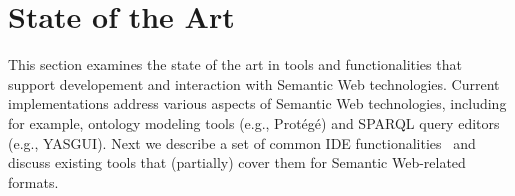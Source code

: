 %
%
%
%
%
%
%
%
%
%
%
%
%
%



\section{State of the Art}%
\label{sec:related_work}

This section examines the state of the art in tools and functionalities that support developement and interaction with Semantic Web technologies. 
Current implementations address various aspects of Semantic Web technologies, including for example, ontology modeling tools (e.g., Protégé) and SPARQL query editors (e.g., YASGUI).
Next we describe a set of common IDE functionalities~\cite{HowAreJava} and discuss existing tools that (partially) cover them for Semantic Web-related formats.

